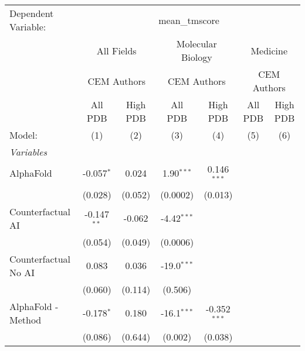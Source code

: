\begingroup
\centering
\begin{tabular}{lcccccc}
   \tabularnewline \midrule \midrule
   Dependent Variable: & \multicolumn{6}{c}{mean\_tmscore}\\
 & \multicolumn{2}{c}{All Fields} & \multicolumn{2}{c}{Molecular Biology} & \multicolumn{2}{c}{Medicine} \\
\cmidrule(lr){2-3} \cmidrule(lr){4-5} \cmidrule(lr){6-7}
 & \multicolumn{2}{c}{CEM Authors} & \multicolumn{2}{c}{CEM Authors} & \multicolumn{2}{c}{CEM Authors} \\
\cmidrule(lr){2-3} \cmidrule(lr){4-5} \cmidrule(lr){6-7}
 & \multicolumn{1}{c}{All PDB} & \multicolumn{1}{c}{High PDB} & \multicolumn{1}{c}{All PDB} & \multicolumn{1}{c}{High PDB} & \multicolumn{1}{c}{All PDB} & \multicolumn{1}{c}{High PDB} \\
\cmidrule(lr){2-2} \cmidrule(lr){3-3} \cmidrule(lr){4-4} \cmidrule(lr){5-5} \cmidrule(lr){6-6} \cmidrule(lr){7-7}
   Model:                                                     & (1)           & (2)     & (3)            & (4)            & (5) & (6)\\  
   \midrule
   \emph{Variables}\\
   AlphaFold                                                  & -0.057$^{*}$  & 0.024   & 1.90$^{***}$   & 0.146$^{***}$  &     &   \\   
                                                              & (0.028)       & (0.052) & (0.0002)       & (0.013)        &     &   \\   
   Counterfactual AI                                          & -0.147$^{**}$ & -0.062  & -4.42$^{***}$  &                &     &   \\   
                                                              & (0.054)       & (0.049) & (0.0006)       &                &     &   \\   
   Counterfactual No AI                                       & 0.083         & 0.036   & -19.0$^{***}$  &                &     &   \\   
                                                              & (0.060)       & (0.114) & (0.506)        &                &     &   \\   
   AlphaFold - Method                                         & -0.178$^{*}$  & 0.180   & -16.1$^{***}$  & -0.352$^{***}$ &     &   \\   
                                                              & (0.086)       & (0.644) & (0.002)        & (0.038)        &     &   \\   

\end{tabular}
